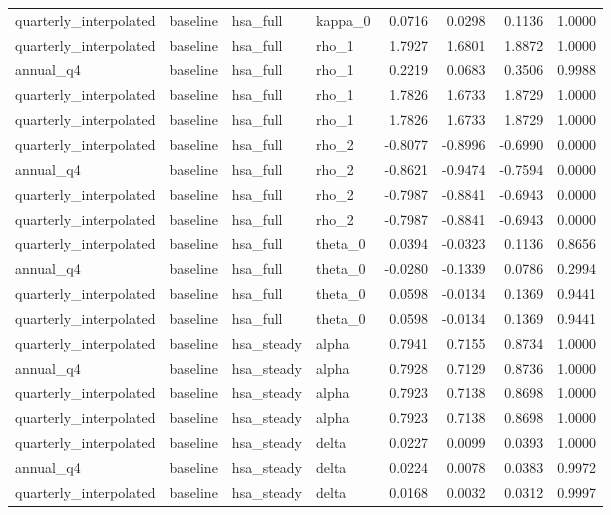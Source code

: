 \begin{tabular}{llllrrrr}
quarterly\_interpolated & baseline & hsa\_full & kappa\_0 & 0.0716 & 0.0298 & 0.1136 & 1.0000 \\
quarterly\_interpolated & baseline & hsa\_full & rho\_1 & 1.7927 & 1.6801 & 1.8872 & 1.0000 \\
annual\_q4 & baseline & hsa\_full & rho\_1 & 0.2219 & 0.0683 & 0.3506 & 0.9988 \\
quarterly\_interpolated & baseline & hsa\_full & rho\_1 & 1.7826 & 1.6733 & 1.8729 & 1.0000 \\
quarterly\_interpolated & baseline & hsa\_full & rho\_1 & 1.7826 & 1.6733 & 1.8729 & 1.0000 \\
quarterly\_interpolated & baseline & hsa\_full & rho\_2 & -0.8077 & -0.8996 & -0.6990 & 0.0000 \\
annual\_q4 & baseline & hsa\_full & rho\_2 & -0.8621 & -0.9474 & -0.7594 & 0.0000 \\
quarterly\_interpolated & baseline & hsa\_full & rho\_2 & -0.7987 & -0.8841 & -0.6943 & 0.0000 \\
quarterly\_interpolated & baseline & hsa\_full & rho\_2 & -0.7987 & -0.8841 & -0.6943 & 0.0000 \\
quarterly\_interpolated & baseline & hsa\_full & theta\_0 & 0.0394 & -0.0323 & 0.1136 & 0.8656 \\
annual\_q4 & baseline & hsa\_full & theta\_0 & -0.0280 & -0.1339 & 0.0786 & 0.2994 \\
quarterly\_interpolated & baseline & hsa\_full & theta\_0 & 0.0598 & -0.0134 & 0.1369 & 0.9441 \\
quarterly\_interpolated & baseline & hsa\_full & theta\_0 & 0.0598 & -0.0134 & 0.1369 & 0.9441 \\
quarterly\_interpolated & baseline & hsa\_steady & alpha & 0.7941 & 0.7155 & 0.8734 & 1.0000 \\
annual\_q4 & baseline & hsa\_steady & alpha & 0.7928 & 0.7129 & 0.8736 & 1.0000 \\
quarterly\_interpolated & baseline & hsa\_steady & alpha & 0.7923 & 0.7138 & 0.8698 & 1.0000 \\
quarterly\_interpolated & baseline & hsa\_steady & alpha & 0.7923 & 0.7138 & 0.8698 & 1.0000 \\
quarterly\_interpolated & baseline & hsa\_steady & delta & 0.0227 & 0.0099 & 0.0393 & 1.0000 \\
annual\_q4 & baseline & hsa\_steady & delta & 0.0224 & 0.0078 & 0.0383 & 0.9972 \\
quarterly\_interpolated & baseline & hsa\_steady & delta & 0.0168 & 0.0032 & 0.0312 & 0.9997 \\

\end{tabular}

